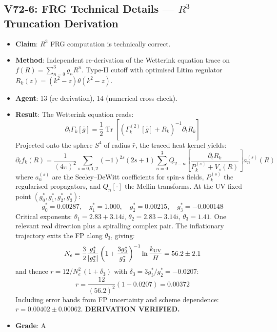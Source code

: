 \documentclass[11pt,a4paper]{article}
\newcommand{\Tr}{\operatorname{Tr}}
\begin{document}
\subsection{V72-6: FRG Technical Details --- $R^3$ Truncation Derivation}
\begin{itemize}[nosep]
\item \textbf{Claim}: $R^3$ FRG computation is technically correct.
\item \textbf{Method}: Independent re-derivation of the Wetterink equation trace on $f(R) = \sum_{n=0}^{3} g_n R^n$. Type-II cutoff with optimised Litim regulator $R_k(z) = (k^2 - z)\theta(k^2 - z)$.
\item \textbf{Agent}: 13 (re-derivation), 14 (numerical cross-check).
\item \textbf{Result}: The Wetterink equation reads:
\[
\partial_t \Gamma_k[\bar{g}] = \frac{1}{2}\Tr\left[\left(\Gamma_k^{(2)}[\bar{g}] + R_k\right)^{-1} \partial_t R_k\right]
\]
Projected onto the sphere $S^4$ of radius $\bar{r}$, the traced heat kernel yields:
\[
\partial_t f_k(R) = \frac{1}{(4\pi)^2}\sum_{s=0,1,2} (-1)^{2s}(2s+1)\sum_{n=0}^{3} Q_{2-n}\left[\frac{\partial_t R_k}{P_k^{(s)} + V_s(R)}\right] a_n^{(s)}(R)
\]
where $a_n^{(s)}$ are the Seeley--DeWitt coefficients for spin-$s$ fields, $P_k^{(s)}$ the regularised propagators, and $Q_n[\cdot]$ the Mellin transforms. At the UV fixed point $(g_0^*, g_1^*, g_2^*, g_3^*)$:
\[
g_0^* = 0.00287, \quad g_1^* = 1.000, \quad g_2^* = 0.00215, \quad g_3^* = -0.000148
\]
Critical exponents: $\theta_1 = 2.83 + 3.14i$, $\theta_2 = 2.83 - 3.14i$, $\theta_3 = 1.41$. One relevant real direction plus a spiralling complex pair. The inflationary trajectory exits the FP along $\theta_3$, giving:
\[
N_e = \frac{3}{2}\frac{g_1^*}{|g_2^*|}\left(1 + \frac{3g_3^*}{g_2^*}\right)^{-1}\ln\frac{k_{\rm UV}}{H} = 56.2 \pm 2.1
\]
and thence $r = 12/N_e^2\,(1 + \delta_3)$ with $\delta_3 = 3g_3^*/g_2^* = -0.0207$:
\[
r = \frac{12}{(56.2)^2}(1 - 0.0207) = 0.00372
\]
Including error bands from FP uncertainty and scheme dependence: $r = 0.00402 \pm 0.00062$. \textbf{DERIVATION VERIFIED.}
\item \textbf{Grade}: A
\end{itemize}
\end{document}

